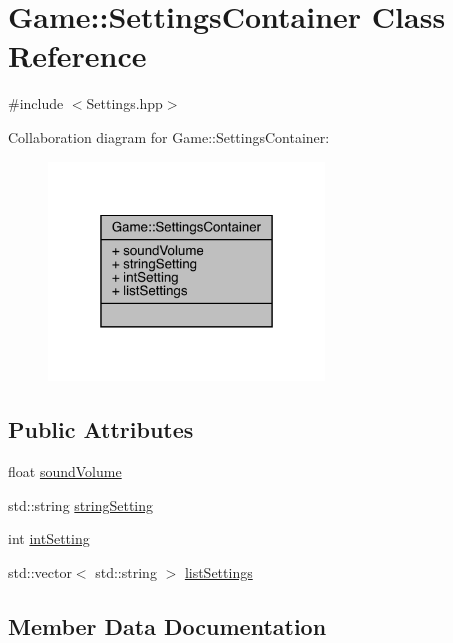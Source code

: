 \hypertarget{class_game_1_1_settings_container}{}\section{Game\+:\+:Settings\+Container Class Reference}
\label{class_game_1_1_settings_container}


{\ttfamily \#include $<$Settings.\+hpp$>$}



Collaboration diagram for Game\+:\+:Settings\+Container\+:\nopagebreak
\begin{figure}[H]
\begin{center}
\leavevmode
\includegraphics[width=208pt]{class_game_1_1_settings_container__coll__graph}
\end{center}
\end{figure}
\subsection*{Public Attributes}
\begin{DoxyCompactItemize}
\item 
float \mbox{\hyperlink{class_game_1_1_settings_container_a27a693595271cf8c08911c1860b39b0b}{sound\+Volume}}
\item 
std\+::string \mbox{\hyperlink{class_game_1_1_settings_container_aca4afe02a4af31e715f795b7408a6dfe}{string\+Setting}}
\item 
int \mbox{\hyperlink{class_game_1_1_settings_container_a335536a6ebf5309d637930ec1883292e}{int\+Setting}}
\item 
std\+::vector$<$ std\+::string $>$ \mbox{\hyperlink{class_game_1_1_settings_container_a9dc30cd4c5a725d00fd9b1385ef62307}{list\+Settings}}
\end{DoxyCompactItemize}


\subsection{Member Data Documentation}
\mbox{\label{class_game_1_1_settings_container_a335536a6ebf5309d637930ec1883292e}} 
